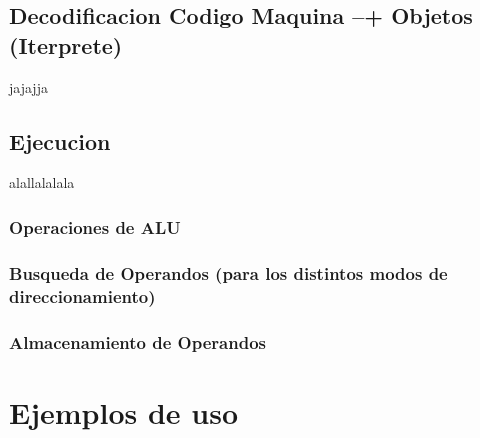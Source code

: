 \subsection{Decodificacion Codigo Maquina --+ Objetos (Iterprete)}
jajajja
\subsection{Ejecucion}
alallalalala

\subsubsection{Operaciones de ALU}

\subsubsection{Busqueda de Operandos (para los distintos modos de direccionamiento)}

\subsubsection{Almacenamiento de Operandos}
\section{Ejemplos de uso}
